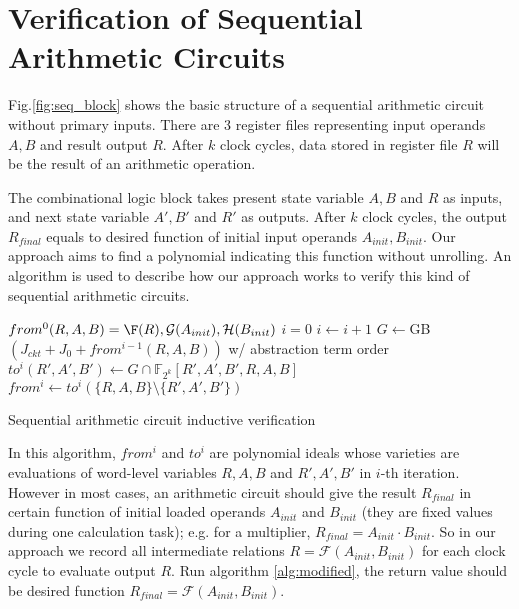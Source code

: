 \section{Verification of Sequential Arithmetic Circuits}
Fig.\ref{fig:seq_block} shows the basic structure of a sequential arithmetic circuit without primary inputs. 
There are 3 register files representing input operands $A, B$ and result output $R$. After $k$ clock cycles,
data stored in register file $R$ will be the result of an arithmetic operation. 

The combinational logic block takes present state variable $A, B$ and $R$ as inputs, and next state variable 
$A', B'$ and $R'$ as outputs. After $k$ clock cycles, the output $R_{final}$ equals to desired function of
initial input operands $A_{init}, B_{init}$. Our approach aims to find a polynomial indicating
this function without unrolling.
An algorithm is used to describe how our approach works to verify this kind 
of sequential arithmetic circuits.

\begin{algorithm}[hbt]
\SetAlgoNoLine

  $from^0(R,A,B) = \F(R), \mathcal{G}(A_{init}), \mathcal{H}(B_{init})$\;
  $i = 0$\;
  {
  	$i \gets i + 1$\;
	$G \gets$GB$(J_{ckt}+ J_0+ from^{i-1}(R,A,B))$ w/ abstraction term order\;
	$to^i(R',A',B')\gets G\cap \mathbb F_{2^k}[R',A',B',R,A,B]$\;
	$from^i \gets to^i(\{R,A,B\}\setminus \{R',A',B'\})$\;
  }
\caption {Sequential arithmetic circuit inductive verification}\label{alg:modified}
\end{algorithm}

In this algorithm, $from^i$ and $to^i$ are polynomial ideals whose varieties are evaluations of word-level
variables $R, A, B$ and $R',A',B'$ in $i$-th iteration. However in most cases, an arithmetic circuit should give the result $R_{final}$ in certain
function of initial loaded operands $A_{init}$ and $B_{init}$ (they are fixed values during one calculation task);
e.g. for a multiplier, $R_{final} = A_{init}\cdot B_{init}$. So in our approach we record all intermediate relations
$R = \mathcal{F}(A_{init}, B_{init})$ for each clock cycle to evaluate output $R$.
Run algorithm \ref{alg:modified}, the return value should be desired function $R_{final} = \mathcal{F}(A_{init},B_{init})$.

